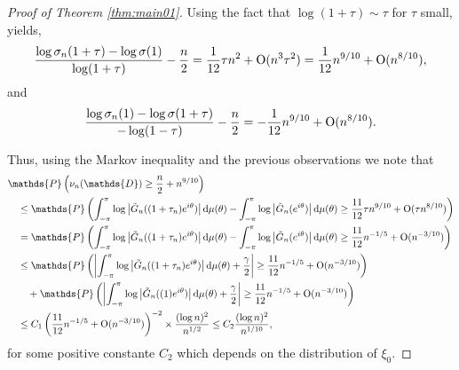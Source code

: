 \documentclass[12pt]{amsart}
\theoremstyle{plain}
\numberwithin{equation}{section}
\renewcommand{\Pr}{\mathbb{P}}
\newcommand{\<}{\langle}
\renewcommand{\>}{\rangle}
\newcommand{\PP}[1]{\left(#1\right)}
\newcommand{\dd}{\textnormal{d}}
\newcommand{\abs}[1]{\left|#1\right|}
\renewcommand{\Pr}[1]{\mathds{P}\left(#1\right)}
\begin{document}
\begin{proof}[Proof of Theorem \ref{thm:main01}]
Using the fact that $\log(1+\tau) \sim \tau$ for $\tau$ small, yields,
\[
\frac{\log\sigma_n(1+\tau)-\log\sigma(1)}{\log(1+\tau)} -\frac{n}{2} = \frac{1}{12}\tau n^2 + \textnormal{O}(n^3\tau^2) = \frac{1}{12}n^{9/10} + \textnormal{O}(n^{8/10}),
\]
and
\[
\frac{\log\sigma_n(1)-\log\sigma(1+\tau)}{-\log(1-\tau)} -\frac{n}{2} = -\frac{1}{12}n^{9/10} + \textnormal{O}(n^{8/10}).
\]

Thus, using the Markov inequality and the previous observations we note that
\begin{align*}
& \Pr{\nu_n(\mathds{D}) \geq \frac{n}{2}+n^{9/10}} \\
& \quad \leq \Pr{{\int_{-\pi}^{\pi} \log \abs{\tilde{G}_n((1+\tau_n)e^{i\theta})} \dd \mu(\theta) - \int_{-\pi}^{\pi} \log \abs{\tilde{G}_n(e^{i\theta}) } \dd \mu(\theta)} \geq \frac{11}{12}\tau n^{9/10} + \textnormal{O}(\tau n^{8/10}) } \\
& \quad = \Pr{{\int_{-\pi}^{\pi} \log \abs{\tilde{G}_n((1+\tau_n)e^{i\theta})} \dd \mu(\theta) - \int_{-\pi}^{\pi} \log \abs{\tilde{G}_n(e^{i\theta}) } \dd \mu(\theta)} \geq \frac{11}{12} n^{-1/5} + \textnormal{O}(n^{-3/10})} \\
& \quad \leq \Pr{\abs{\int_{-\pi}^{\pi} \log \abs{\tilde{G}_n((1+\tau_n)e^{i\theta})} \dd \mu(\theta) + \frac{\gamma}{2}} \geq \frac{11}{12} n^{-1/5} + \textnormal{O}(n^{-3/10}) } \\
& \quad\quad + \Pr{\abs{\int_{-\pi}^{\pi} \log \abs{\tilde{G}_n((1)e^{i\theta})} \dd \mu(\theta) + \frac{\gamma}{2}} \geq \frac{11}{12} n^{-1/5} + \textnormal{O}(n^{-3/10}) } \\
& \quad \leq  C_1 \PP{\frac{11}{12} n^{-1/5} + \textnormal{O}(n^{-3/10})}^{-2} \times \frac{(\log n)^2}{n^{1/2}} \leq C_2 \frac{(\log n)^2}{n^{1/10}},
\end{align*}
for some positive constante $C_2$ which depends on the distribution of $\xi_0$.


\end{proof}
\end{document}
